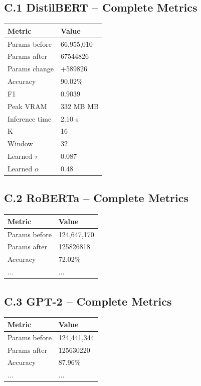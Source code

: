 \subsection{C.1 DistilBERT -- Complete Metrics}

\begin{table}[H]
\centering
\small
\begin{tabular}{ll}
\toprule
\textbf{Metric} & \textbf{Value} \\
\midrule
Params before & 66,955,010 \\
Params after & 67544826 \\
Params change & +589826 \\
Accuracy & 90.02\% \\
F1 & 0.9039 \\
Peak VRAM & 332 MB MB \\
Inference time & 2.10 s \\
K & 16 \\
Window & 32 \\
Learned $\tau$ & 0.087 \\
Learned $\alpha$ & 0.48 \\
\bottomrule
\end{tabular}
\end{table}

\subsection{C.2 RoBERTa -- Complete Metrics}

\begin{table}[H]
\centering
\small
\begin{tabular}{ll}
\toprule
\textbf{Metric} & \textbf{Value} \\
\midrule
Params before & 124,647,170 \\
Params after & 125826818 \\
Accuracy & 72.02\% \\
... & ... \\
\bottomrule
\end{tabular}
\end{table}

\subsection{C.3 GPT-2 -- Complete Metrics}

\begin{table}[H]
\centering
\small
\begin{tabular}{ll}
\toprule
\textbf{Metric} & \textbf{Value} \\
\midrule
Params before & 124,441,344 \\
Params after & 125630220 \\
Accuracy & 87.96\% \\
... & ... \\
\bottomrule
\end{tabular}
\end{table}


